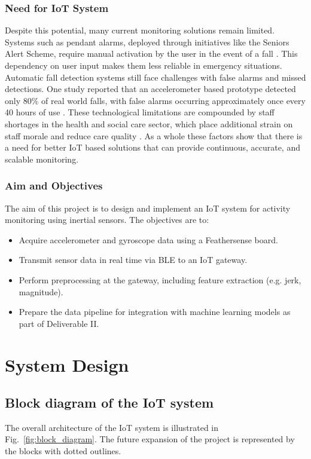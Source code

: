 \documentclass[conference]{IEEEtran}
\begin{document}
\subsubsection{Need for IoT System}
Despite this potential, many current monitoring solutions remain limited. Systems such as pendant alarms, deployed through initiatives like the Seniors Alert Scheme, require manual activation by the user in the event of a fall \cite{b2}. This dependency on user input makes them less reliable in emergency situations. Automatic fall detection systems still face challenges with false alarms and missed detections. One study reported that an accelerometer based prototype detected only 80\% of real world falls, with false alarms occurring approximately once every 40 hours of use \cite{b3}. These technological limitations are compounded by staff shortages in the health and social care sector, which place additional strain on staff morale and reduce care quality \cite{b4}. As a whole these factors show that there is a need for better IoT based solutions that can provide continuous, accurate, and scalable monitoring.

\subsubsection{Aim and Objectives}\label{AO}
The aim of this project is to design and implement an IoT system for activity monitoring using inertial sensors. The objectives are to:
\begin{itemize}
	\item Acquire accelerometer and gyroscope data using a Feathersense board.
	\item Transmit sensor data in real time via BLE to an IoT gateway.
	\item Perform preprocessing at the gateway, including feature extraction (e.g. jerk, magnitude).
	\item Prepare the data pipeline for integration with machine learning models as part of Deliverable II.
\end{itemize}


\section{System Design}

\subsection{Block diagram of the IoT system}
The overall architecture of the IoT system is illustrated in Fig.~\ref{fig:block_diagram}. The future expansion of the project is represented by the blocks with dotted outlines.
\end{document}
